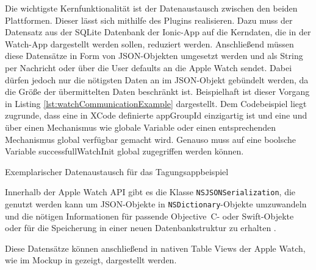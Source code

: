 Die wichtigste Kernfunktionalität ist der Datenaustausch zwischen den beiden Plattformen.
Dieser lässt sich mithilfe des Plugins realisieren. Dazu muss der Datensatz aus der SQLite Datenbank der Ionic-App auf die Kerndaten, die in der Watch-App dargestellt werden sollen, reduziert werden. Anschließend müssen diese Datensätze in Form von JSON-Objekten umgesetzt werden und als String per Nachricht oder über die User defaults an die Apple Watch sendet. Dabei dürfen jedoch nur die nötigsten Daten an im JSON-Objekt gebündelt werden, da die Größe der übermittelten Daten beschränkt ist. Beispielhaft ist dieser Vorgang in Listing \ref{lst:watchCommunicationExample} dargestellt. Dem Codebeispiel liegt zugrunde, dass eine in XCode definierte appGroupId einzigartig ist und eine und über einen Mechanismus wie globale Variable oder einen entsprechenden Mechanismus global verfügbar gemacht wird. Genauso muss auf eine boolsche Variable successfullWatchInit global zugegriffen werden können. 

\begin{listing}[htb]
    
    \caption{Exemplarischer Datenaustausch für das Tagungsappbeispiel}
    \label{lst:watchCommunicationExample}
\end{listing}

Innerhalb der Apple Watch API gibt es die Klasse \texttt{NSJSONSerialization}, die genutzt werden kann um JSON-Objekte in \texttt{NSDictionary}-Objekte umzuwandeln und die nötigen Informationen für passende Objective~C- oder Swift-Objekte oder für die Speicherung in einer neuen Datenbankstruktur zu erhalten \cite{appleDokuJSONSerialization}. 

Diese Datensätze können anschließend in nativen Table Views der Apple Watch, wie im Mockup in  gezeigt, dargestellt werden.

